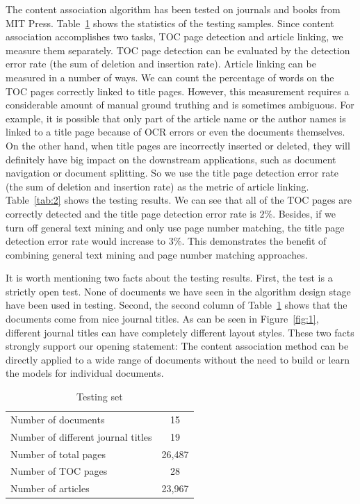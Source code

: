 \documentclass[10pt]{article}
\begin{document}
The content association algorithm has been tested on journals and books from MIT Press. Table~\ref{tab:1} shows the statistics of the testing samples. Since content association accomplishes two tasks, TOC page detection and article linking, we measure them separately. TOC page detection can be evaluated by the detection error rate (the sum of deletion and insertion rate). Article linking can be measured in a number of ways. We can count the percentage of words on the TOC pages correctly linked to title pages. However, this measurement requires a considerable amount of manual ground truthing and is sometimes ambiguous. For example, it is possible that only part of the article name or the author names is linked to a title page because of OCR errors or even the documents themselves. On the other hand, when title pages are incorrectly inserted or deleted, they will definitely have big impact on the downstream applications, such as document navigation or document splitting. So we use the title page detection error rate (the sum of deletion and insertion rate) as the metric of article linking. Table~\ref{tab:2} shows the testing results. We can see that all of the TOC pages are correctly detected and the title page detection error rate is \(2\%\). Besides, if we turn off general text mining and only use page number matching, the title page detection error rate would increase to \(3\%\). This demonstrates the benefit of combining general text mining and page number matching approaches.

It is worth mentioning two facts about the testing results. First, the test is a strictly open test. None of documents we have seen in the algorithm design stage have been used in testing. Second, the second column of Table~\ref{tab:1} shows that the documents come from nice journal titles. As can be seen in Figure~\ref{fig:1}, different journal titles can have completely different layout styles. These two facts strongly support our opening statement: The content association method can be directly applied to a wide range of documents without the need to build or learn the models for individual documents.

\begin{table}[htbp]
\centering
\caption{Testing set}
\label{tab:1}
\begin{tabular}{|l|c|}
\hline
Number of documents & 15 \\
Number of different journal titles & 19 \\
Number of total pages & 26,487 \\
Number of TOC pages & 28 \\
Number of articles & 23,967 \\
\hline
\end{tabular}
\end{table}
\end{document}
